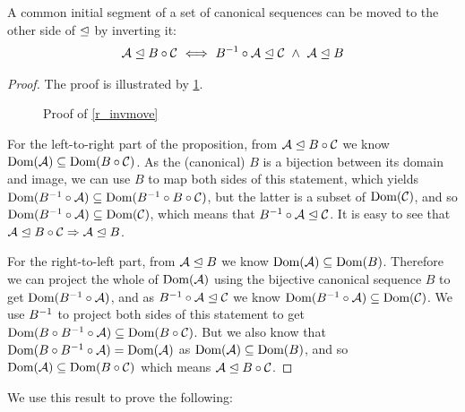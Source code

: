 \begin{mylem}
A common initial segment of a set of canonical sequences can be moved 
to the other side of $\trianglelefteq$ by inverting it:
\begin{gather*}
{\mathcal{A}}\trianglelefteq{B\circ\mathcal{C}}
\ \Longleftrightarrow \ {B^{-1}\circ\mathcal{A}}\trianglelefteq{\mathcal{C}} 
\ \wedge \  {\mathcal{A}}\trianglelefteq{B}
\end{gather*}
\end{mylem}
\begin{proof}

The proof is illustrated by \cref{fig_invmove}.

\begin{figure}[htb]

\caption{Proof of \cref{r_invmove}}\label{fig_invmove}
\end{figure}

For the left-to-right part of the proposition,
from ${\mathcal{A}}\trianglelefteq{B\circ\mathcal{C}}$ we know $\textrm{Dom}({\mathcal{A}}) \subseteq \textrm{Dom}({B\circ\mathcal{C}})$.
As the (canonical) $B$ is a bijection between its domain and image,
we can use $B$ to map both sides of this statement, which yields
$\textrm{Dom}({B^{-1}\circ\mathcal{A}}) \subseteq \textrm{Dom}({B^{-1}\circ B\circ\mathcal{C}})$,
but the latter is a subset of $\textrm{Dom}({\mathcal{C}})$,
and so $\textrm{Dom}({B^{-1}\circ\mathcal{A}}) \subseteq \textrm{Dom}({\mathcal{C}})$,
which means that ${B^{-1}\circ\mathcal{A}}\trianglelefteq{\mathcal{C}}$.
It is easy to see that ${\mathcal{A}}\trianglelefteq{B\circ\mathcal{C}} \Rightarrow {\mathcal{A}}\trianglelefteq{B}$.

For the right-to-left part,
from ${\mathcal{A}}\trianglelefteq{B}$ we know $\textrm{Dom}({\mathcal{A}}) \subseteq \textrm{Dom}({B})$.
Therefore we can project the whole of $\textrm{Dom}({\mathcal{A}})$ using the bijective canonical sequence $B$
to get $\textrm{Dom}({B^{-1}\circ\mathcal{A}})$, and as ${B^{-1}\circ\mathcal{A}}\trianglelefteq{\mathcal{C}}$
we know
$\textrm{Dom}({B^{-1}\circ\mathcal{A}}) \subseteq \textrm{Dom}({\mathcal{C}})$.
We use $B^{-1}$ to project both sides of this statement to get
$\textrm{Dom}({B\circ B^{-1}\circ\mathcal{A}}) \subseteq \textrm{Dom}({B\circ\mathcal{C}})$.
But we also know that $\textrm{Dom}({B\circ B^{-1}\circ\mathcal{A}}) = \textrm{Dom}({\mathcal{A}})$
as $\textrm{Dom}({\mathcal{A}}) \subseteq \textrm{Dom}({B})$,
and so $\textrm{Dom}({\mathcal{A}}) \subseteq \textrm{Dom}({B\circ\mathcal{C}})$ which means
${\mathcal{A}}\trianglelefteq{B\circ\mathcal{C}}$.
\end{proof}

We use this result to prove the following:

